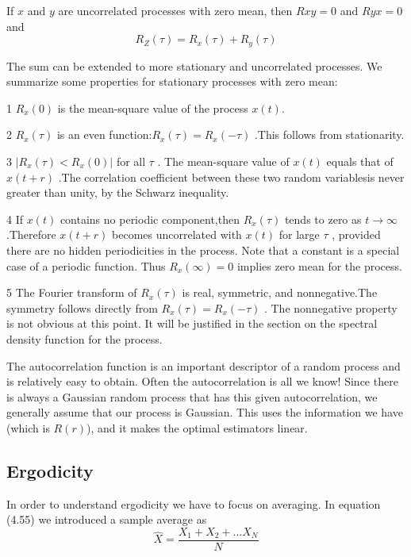 	    
	    If $ x $ and $ y $ are uncorrelated processes with zero mean, then $ Rxy =0 $ and $ Ryx=0 $ and 
	    \begin{equation}\label{5.14}
	    R_{Z}(\tau)=R_{x}(\tau)+R_{y}(\tau) 
	    \end{equation}
	     
	    
	    The sum can be extended to more stationary and uncorrelated processes. We summarize some properties for stationary processes with zero mean: 
	    
	    1  $ R_{x}(0) $ is the mean-square value of the process  $x(t)$. 
	    
	    2  $ R_{x}(\tau) $ is an even function:$  R_{x}(\tau)= R_{x}(-\tau) $ .This follows from stationarity. 
	    
	    3 $ \left|R_{x}(\tau) < R_{x}(0) \right|  $ for all $ \tau $ . The mean-square value of $x(t)$ equals that of $x(t+r)$ .The correlation coefficient between these two random variablesis never greater than unity, by the Schwarz inequality. 
	    
	    4  If $ x(t)$ contains no periodic component,then  $R_{x}(\tau)$ tends to zero as $t\rightarrow\infty$.Therefore $x(t + r)$ becomes uncorrelated with $x(t)$ for large $\tau$ , provided there are no hidden periodicities in the process. Note that a constant is a special case of a periodic function. Thus $R_{x}(\infty)=0$ implies zero mean for the process. 
	    
	    5 The Fourier transform of $ R_{x}(\tau)$ is real, symmetric, and nonnegative.The symmetry follows directly from $R_{x}(\tau)=R_{x}(-\tau) $ . The nonnegative property is not obvious at this point. It will be justified in the section on the spectral density function for the process.
	    
	     The autocorrelation function is an important descriptor of a random process and is relatively easy to obtain. Often the autocorrelation is all we know! Since there is always a Gaussian random process that has this given autocorrelation, we generally assume that our process is Gaussian. This uses the information we have (which is $R(r)$), and it makes the optimal estimators linear.
	     
	      
	     \subsection { Ergodicity} 
	     
	     In order to understand ergodicity we have to focus on averaging. In equation (4.55) we introduced a sample average as
	     \[  \hat{X}=\frac{X_{1}+X_{2}+...X_{N}}{N}\]
	     
